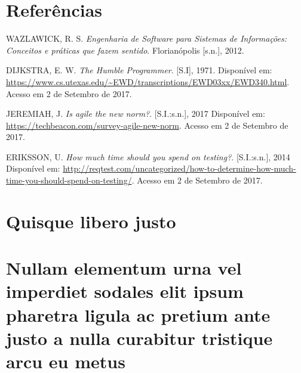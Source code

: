 \documentclass[
  12pt,       %
  openright,      %
  twoside,      %
  a4paper,      %
  english,      %
  french,       %
  spanish,      %
  brazil,       %
  ]{abntex2}
\begin{document}
\chapter*{Referências}
\noindent
WAZLAWICK, R. S. \textit{Engenharia de Software para Sistemas de Informações: Conceitos e práticas que fazem sentido}. Florianópolis [s.n.], 2012.

\noindent
DIJKSTRA, E. W. \textit{The Humble Programmer}. [S.I], 1971. Disponível em:
\url{https://www.cs.utexas.edu/~EWD/transcriptions/EWD03xx/EWD340.html}.
Acesso em 2 de Setembro de 2017.

\noindent
JEREMIAH, J. \textit{Is agile the new norm?}. [S.I.:s.n.], 2017 Disponível em:
\url{https://techbeacon.com/survey-agile-new-norm}. Acesso em 2 de Setembro de 2017.

\noindent
ERIKSSON, U. \textit{How much time should you spend on testing?}. [S.I.:s.n.], 2014 Disponível em: \url{http://reqtest.com/uncategorized/how-to-determine-how-much-time-you-should-spend-on-testing/}. Acesso em 2 de Setembro de 2017.

%
%


\begin{apendicesenv}

\partapendices

\chapter{Quisque libero justo}

\lipsum[50]

\chapter{Nullam elementum urna vel imperdiet sodales elit ipsum pharetra ligula
ac pretium ante justo a nulla curabitur tristique arcu eu metus}
\lipsum[55-57]

\end{apendicesenv}
\end{document}
